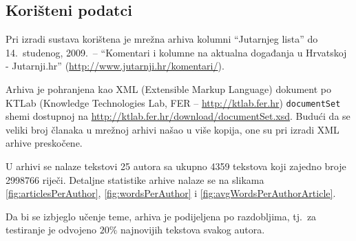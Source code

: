 \documentclass[11pt,english]{article}
\begin{document}
\begin{multicols}{2}
% 

\section{Korišteni podatci}
\label{sec:podatci}
Pri izradi sustava korištena je mrežna arhiva kolumni ``Jutarnjeg lista'' do
14.~studenog, 2009.~-- ``Komentari i kolumne na aktualna događanja u
Hrvatskoj - Jutarnji.hr'' (\url{http://www.jutarnji.hr/komentari/}).

Arhiva je pohranjena kao XML (Extensible Markup Language) dokument po KTLab
(Knowledge Technologies Lab, FER -- \url{http://ktlab.fer.hr})
\texttt{documentSet} shemi dostupnoj na
\url{http://ktlab.fer.hr/download/documentSet.xsd}. Budući da se veliki broj
članaka u mrežnoj arhivi našao u više kopija, one su pri izradi XML arhive
preskočene.

U arhivi se nalaze tekstovi 25 autora sa ukupno 4359 tekstova koji zajedno broje
2998766 riječi. Detaljne statistike arhive nalaze se na slikama
\ref{fig:articlesPerAuthor}, \ref{fig:wordsPerAuthor} i
\ref{fig:avgWordsPerAuthorArticle}.

Da bi se izbjeglo učenje teme, arhiva je podijeljena po razdobljima, tj.~za
testiranje je odvojeno $20\%$ najnovijih tekstova svakog autora.

\begin{minipage}{0.8\linewidth}
\vspace{10pt}
\centerline{\resizebox{1.4\linewidth}{!}{}}%
%
\label{fig:articlesPerAuthor}
\end{minipage}


\end{multicols}
\end{document}
